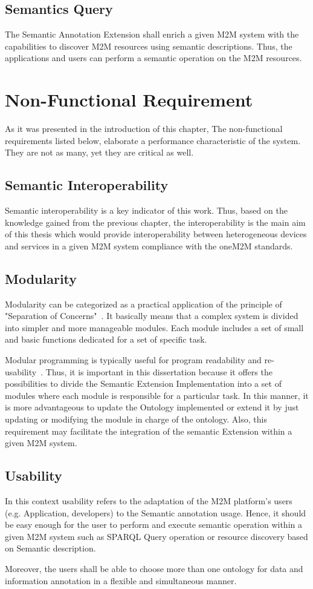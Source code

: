 \subsection{Semantics Query}
The Semantic Annotation Extension shall enrich a given M2M system with the capabilities to discover M2M resources using semantic descriptions. Thus, the applications and users can perform a semantic operation on the M2M resources.

\section{Non-Functional Requirement}
As it was presented in the introduction of this chapter, The non-functional requirements listed below, elaborate a performance characteristic of the system. They are not as many, yet they are critical as well.
\subsection{Semantic Interoperability}
Semantic interoperability is a key indicator of this work. Thus, based on the knowledge gained from the previous chapter, the interoperability is the main aim of this thesis which would provide interoperability between heterogeneous devices and services in a given M2M system compliance with the oneM2M standards.
\subsection{Modularity}
Modularity can be categorized as a practical application of the principle of "Separation of Concerns"~\cite{mo}. It basically means that a complex system is divided into simpler and more manageable modules. Each module includes a set of small and basic functions dedicated for a set of specific task. \par
Modular programming is typically useful for program readability and re-usability~\cite{mo}. Thus, it is important in this dissertation because it offers the possibilities to divide the Semantic Extension Implementation into a set of modules where each module is responsible for a particular task. In this manner, it is more advantageous to update the Ontology implemented or extend it by just updating or modifying the module in charge of the ontology. Also, this requirement may facilitate the integration of the semantic Extension within a given M2M system.
\subsection{Usability}
In this context usability refers to the adaptation of the M2M platform's users (e.g. Application, developers) to the Semantic annotation usage. Hence, it should be easy enough for the user to perform and execute semantic operation within a given M2M system such as SPARQL Query operation or resource discovery based on Semantic description.\par  
Moreover, the users shall be able to choose more than one ontology for data and information annotation in a flexible and simultaneous manner.
